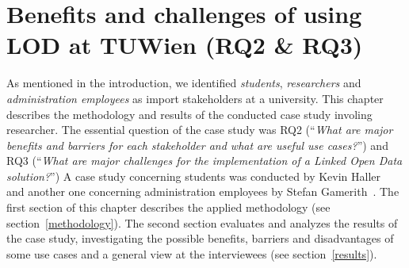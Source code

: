 \section{Benefits and challenges of using LOD at TUWien (RQ2 \& RQ3)}
As mentioned in the introduction, we identified \textit{students}, \textit{researchers} and \textit{administration employees} as import stakeholders at a university. This chapter describes the methodology and results of the conducted case study involing researcher. The essential question of the case study was RQ2 (``\textit{What are major benefits and barriers for each stakeholder and what are useful use cases?}'') and RQ3 (``\textit{What are major challenges for the implementation of a Linked Open Data solution?}'') 
A case study concerning students was conducted by Kevin Haller~\cite{haller_publishing_2016} and another one concerning administration employees by Stefan Gamerith~\cite{gamerith_publishing_2016}.
The first section of this chapter describes the applied methodology (see section~\ref{methodology}). The second section evaluates and analyzes the results of the case study, investigating the possible benefits, barriers and disadvantages of some use cases and a general view at the interviewees (see section~\ref{results}).

\newpage

